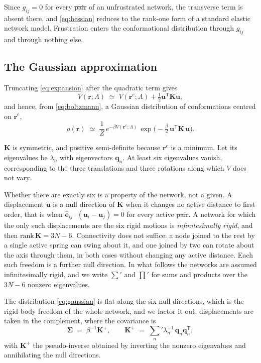 \documentclass[11pt]{article}
\newcommand{\rr}{\mathbf{r}}
\newcommand{\ee}{\hat{\mathbf{e}}}
\newcommand{\KK}{\mathbf{K}}
\newcommand{\LL}{\Lambda}
\newcommand{\re}{\rr^{e}}
\providecommand{\DIFaddtex}[1]{{\protect\color{blue}\uwave{#1}}} %
\providecommand{\DIFdeltex}[1]{{\protect\color{red}\sout{#1}}}                      %
\providecommand{\DIFaddbegin}{} %
\providecommand{\DIFaddend}{} %
\providecommand{\DIFdelbegin}{} %
\providecommand{\DIFdelend}{} %
\providecommand{\DIFadd}[1]{\texorpdfstring{\DIFaddtex{#1}}{#1}} %
\providecommand{\DIFdel}[1]{\texorpdfstring{\DIFdeltex{#1}}{}} %
\begin{document}
Since $g_{ij} = 0$ for every \DIFdelbegin \DIFdel{pair }\DIFdelend \DIFaddbegin \DIFadd{spring }\DIFaddend of an unfrustrated network, the transverse term
is absent there, and \eqref{eq:hessian} reduces to the rank-one form of a standard
elastic network model. Frustration enters the conformational distribution through
$g_{ij}$ and through nothing else.

\subsection{The Gaussian approximation}

Truncating \eqref{eq:expansion} after the quadratic term gives
\begin{equation}
V(\rr;\LL) \;\simeq\; V(\re;\LL) + \tfrac12 \mathbf{u}^{\mathsf T}\KK\mathbf{u},
\label{eq:quadratic}
\end{equation}
and hence, from \eqref{eq:boltzmann}, a Gaussian distribution of conformations
centred on $\re$,
\begin{equation}
\rho(\rr) \;\simeq\; \frac{1}{Z}\, e^{-\beta V(\re;\LL)}\,
\exp\!\big(-\tfrac{\beta}{2}\,\mathbf{u}^{\mathsf T}\KK\,\mathbf{u}\big).
\label{eq:gaussian}
\end{equation}

$\KK$ is symmetric, and positive semi-definite because $\re$ is a minimum. Let its
eigenvalues be $\lambda_n$ with eigenvectors $\mathbf{q}_n$. At least six
eigenvalues vanish, corresponding to the three translations and three rotations
along which $V$ does not vary.

Whether there are exactly six is a property of the network, not a given. A
displacement $\mathbf{u}$ is a null direction of $\KK$ when it changes no active
distance to first order, that is when $\ee_{ij}\cdot(\mathbf{u}_i - \mathbf{u}_j) = 0$
for every active \DIFdelbegin \DIFdel{pair}\DIFdelend \DIFaddbegin \DIFadd{spring}\DIFaddend . A network for which the only such displacements are the six
rigid motions is \emph{infinitesimally rigid}, and then $\mathrm{rank}\,\KK = 3N-6$.
Connectivity does not suffice: a node joined to the rest by a single active spring
can swing about it, and one joined by two can rotate about the axis through them,
in both cases without changing any active distance. Each such freedom is a further
null direction. In what follows the networks are assumed infinitesimally rigid,
and we write $\sum'$ and $\prod'$ for sums and products over the $3N-6$ nonzero
eigenvalues.

The distribution \eqref{eq:gaussian} is flat along the six null directions, which
is the rigid-body freedom of the whole network, and we factor it out: displacements
are taken in the complement, where the covariance is
\begin{equation}
\bm{\Sigma} \;=\; \beta^{-1}\KK^{+},
\qquad
\KK^{+} \;=\; \sum_n{}' \lambda_n^{-1}\, \mathbf{q}_n \mathbf{q}_n^{\mathsf T},
\label{eq:covariance}
\end{equation}
with $\KK^{+}$ the pseudo-inverse obtained by inverting the nonzero eigenvalues
and annihilating the null directions.
\end{document}
